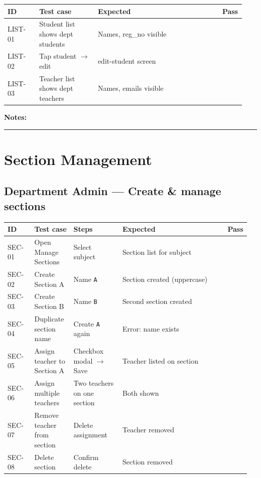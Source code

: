 \documentclass[11pt,a4paper,oneside]{article}
\newcommand{\chk}{\fbox{\rule{0pt}{1.05ex}\rule{1.05ex}{0pt}}}
\newcommand{\fillinlong}{\rule{0.72\textwidth}{0.4pt}}
\newcommand{\notesblock}{\par\smallskip\noindent\textbf{Notes:}\ \fillinlong\par\smallskip}
\newcommand{\tcheadfour}{%
  \toprule
  \textbf{ID} & \textbf{Test case} & \textbf{Expected} & \textbf{Pass} \\
  \midrule
}
\newcommand{\tcheadfive}{%
  \toprule
  \textbf{ID} & \textbf{Test case} & \textbf{Steps} & \textbf{Expected} & \textbf{Pass} \\
  \midrule
}
\begin{document}
\small
\begin{tabular}{@{}>{\raggedright\arraybackslash}p{0.13\linewidth} >{\raggedright\arraybackslash}p{0.24\linewidth} >{\raggedright\arraybackslash}p{0.51\linewidth} >{\centering\arraybackslash}p{0.06\linewidth}@{}}
  \tcheadfour
  LIST-01 & Student list shows dept students & Names, reg\_no visible   & \chk \\
  LIST-02 & Tap student $\rightarrow$ edit   & edit-student screen      & \chk \\
  LIST-03 & Teacher list shows dept teachers & Names, emails visible    & \chk \\
  \bottomrule
\end{tabular}
\normalsize

\notesblock

\section{Section Management}

\subsection{Department Admin — Create \& manage sections}

\small
\begin{tabular}{@{}>{\raggedright\arraybackslash}p{0.11\linewidth} >{\raggedright\arraybackslash}p{0.16\linewidth} >{\raggedright\arraybackslash}p{0.20\linewidth} >{\raggedright\arraybackslash}p{0.43\linewidth} >{\centering\arraybackslash}p{0.06\linewidth}@{}}
  \tcheadfive
  SEC-01 & Open Manage Sections       & Select subject                    & Section list for subject           & \chk \\
  SEC-02 & Create Section A             & Name \texttt{A}                   & Section created (uppercase)        & \chk \\
  SEC-03 & Create Section B             & Name \texttt{B}                   & Second section created             & \chk \\
  SEC-04 & Duplicate section name       & Create \texttt{A} again           & Error: name exists                 & \chk \\
  SEC-05 & Assign teacher to Section A  & Checkbox modal $\rightarrow$ Save & Teacher listed on section          & \chk \\
  SEC-06 & Assign multiple teachers     & Two teachers on one section       & Both shown                         & \chk \\
  SEC-07 & Remove teacher from section  & Delete assignment                 & Teacher removed                    & \chk \\
  SEC-08 & Delete section               & Confirm delete                    & Section removed                    & \chk \\
  \bottomrule
\end{tabular}
\normalsize
\end{document}
